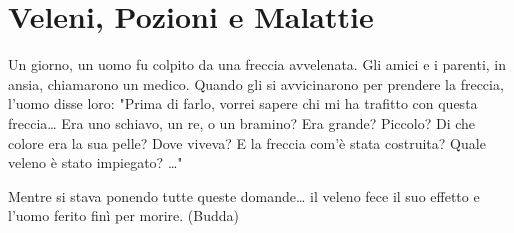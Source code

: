 \section{Veleni, Pozioni e Malattie}

\label{veleni-e-pozioni}

\begin{enfasi}{
Un giorno, un uomo fu colpito da una freccia avvelenata. Gli amici e i parenti, in ansia, chiamarono un medico. Quando gli si avvicinarono per prendere la freccia, l'uomo disse loro: "Prima di farlo, vorrei sapere chi mi ha trafitto con questa freccia… Era uno schiavo, un re, o un bramino? Era grande? Piccolo? Di che colore era la sua pelle? Dove viveva? E la freccia com'è stata costruita? Quale veleno è stato impiegato? …"

Mentre si stava ponendo tutte queste domande… il veleno fece il suo effetto e l'uomo ferito finì per morire. (Budda)}\end{enfasi}

